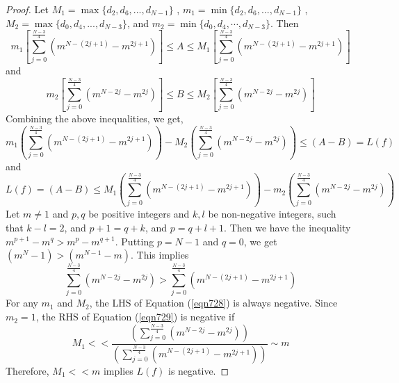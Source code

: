 \documentclass[10pt,a4paper]{amsart}
\begin{document}
\begin{proof}
\noindent
Let $ M_{1} = \max \{ d_{2}, d_{6}, ... , d_{N-1}\} $ ,   $ m_{1} =\min \{ d_{2}, d_{6},...,d_{N-1}\} $ ,  $ M_{2} = \max \{ d_{0}, d_{4}, ... , d_{N-3}\} $,  and $ m_{2} = \min \{ d_{0}, d_{4},  \cdots,  d_{N-3}\} $. 
Then  
\begin{equation}
  m_{1} \left [\sum_{j=0}^{\frac{N-3}{4}} ( m^{N-(2j+1)}-m^{2j+1}) \right ] \leq A \leq M_{1} \left [\sum_{j=0}^{\frac{N-3}{4}} ( m^{N-(2j+1)}-m^{2j+1}) \right ] \nonumber
\end{equation}
and 
\begin{equation}
  m_{2} \left [ \sum_{j=0}^{\frac{N-3}{4}} ( m^{N-2j}-m^{2j}) \right ] \leq B \leq M_{2} \left [ \sum_{j=0}^{\frac{N-3}{4}} ( m^{N-2j}-m^{2j})\right ] \nonumber
\end{equation}
\noindent
Combining the above inequalities,  we get, 
\begin{equation}
    m_{1} \left ( \sum_{j=0}^{\frac{N-3}{4}} ( m^{N-(2j+1)}-m^{2j+1}) \right )-  M_{2} \left ( \sum_{j=0}^{\frac{N-3}{4}} ( m^{N-2j}-m^{2j}) \right ) \leq (A-B) = L(f) \label{eqn728}
\end{equation}
and 
\begin{equation}
   L(f)=(A-B)
   \leq M_{1} \left ( \sum_{j=0}^{\frac{N-3}{4}} ( m^{N-(2j+1)}-m^{2j+1}) \right ) - m_{2} \left ( \sum_{j=0}^{\frac{N-3}{4}} ( m^{N-2j}-m^{2j}) \right )  \label{eqn729}
\end{equation}
 \noindent
 Let $m \neq 1$ and $p, q$  be positive integers and $k,l$ be non-negative integers,  such that $k-l=2$,  and $p+1 = q+k$,   and $p = q+l+1$.  Then we have the inequality $ m^{p+1}-m^{q} > m^{p}-m^{q+1}$.  Putting $p = N-1$ and $q=0$,  we get $(m^{N}-1) > (m^{N-1}-m)$.  This implies 
\begin{equation}
  \sum_{j=0}^{\frac{N-3}{4}} ( m^{N-2j}-m^{2j}) > \sum_{j=0}^{\frac{N-3}{4}} ( m^{N-(2j+1)}-m^{2j+1})  
\end{equation}
\noindent
For any $m_{1}$ and $M_{2}$,  the LHS of Equation (\ref{eqn728}) is always negative.  Since $m_{2} =1$,  the RHS of Equation (\ref{eqn729}) is negative if 
\begin{equation}
    M_{1}<< \frac{ \left (\sum_{j=0}^{\frac{N-3}{4}} ( m^{N-2j}-m^{2j}) \right )}{\left ( \sum_{j=0}^{\frac{N-3}{4}} ( m^{N-(2j+1)}-m^{2j+1}) \right )} \sim m \nonumber
\end{equation}
\noindent
Therefore,  $M_{1} << m $ implies $L(f)$ is negative.  
\end{proof}
\end{document}

